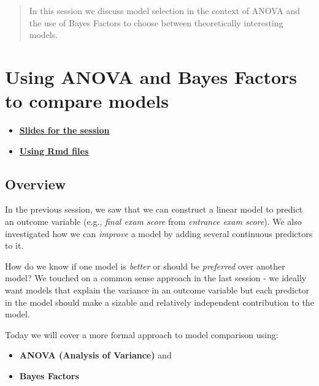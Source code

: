 \documentclass[
]{book}
\providecommand{\tightlist}{%
  \setlength{\itemsep}{0pt}\setlength{\parskip}{0pt}}
\theoremstyle{definition}
\theoremstyle{definition}
\theoremstyle{definition}
\theoremstyle{definition}
\theoremstyle{remark}
\begin{document}
\begin{quote}
In this session we discuss model selection in the context of ANOVA and the use
of Bayes Factors to choose between theoretically interesting models.
\end{quote}

\hypertarget{using-anova-and-bayes-factors-to-compare-models}{%
\section{Using ANOVA and Bayes Factors to compare models}\label{using-anova-and-bayes-factors-to-compare-models}}

\begin{itemize}
\tightlist
\item
  \href{slides/PSYC753_Chris2.pptx}{\textbf{Slides for the session}}
\item
  \href{slides/PSYC753_Chris2_Rmd.pptx}{\textbf{Using Rmd files}}
\end{itemize}

\hfill\break

\hypertarget{overview-2}{%
\subsection{Overview}\label{overview-2}}

In the previous session, we saw that we can construct a linear model to predict an outcome variable (e.g., \emph{final exam score} from \emph{entrance exam score}). We also investigated how we can \emph{improve} a model by adding several continuous predictors to it.

\hfill\break
How do we know if one model is \emph{better} or should be \emph{preferred} over another model? We touched on a common sense approach in the last session - we ideally want models that explain the variance in an outcome variable but each predictor in the model should make a sizable and relatively independent contribution to the model.

\hfill\break

Today we will cover a more formal approach to model comparison using:

\begin{itemize}
\item
  \textbf{ANOVA (Analysis of Variance)} and
\item
  \textbf{Bayes Factors}
\end{itemize}

\hfill\break
\end{document}
